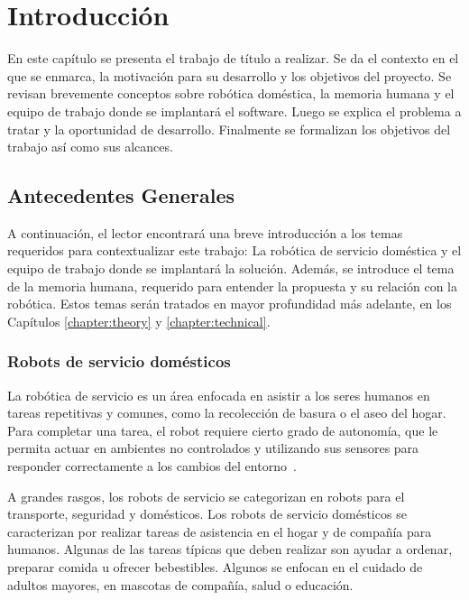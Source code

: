 \chapter{Introducción}\label{chapter:introduction}

En este capítulo se presenta el trabajo de título a realizar. Se da el contexto en el que se enmarca, la motivación para su desarrollo y los objetivos del proyecto. Se revisan brevemente conceptos sobre robótica doméstica, la memoria humana y el equipo de trabajo donde se implantará el software. Luego se explica el problema a tratar y la oportunidad de desarrollo. Finalmente se formalizan los objetivos del trabajo así como sus alcances.


\section{Antecedentes Generales}

A continuación, el lector encontrará una breve introducción a los temas requeridos para contextualizar este trabajo: La robótica de servicio doméstica y el equipo de trabajo donde se implantará la solución. Además, se introduce el tema de la memoria humana, requerido para entender la propuesta y su relación con la robótica. Estos temas serán tratados en mayor profundidad más adelante, en los Capítulos \ref{chapter:theory} y \ref{chapter:technical}.


\subsection{Robots de servicio domésticos}

La robótica de servicio es un área enfocada en asistir a los seres humanos en tareas repetitivas y comunes, como la recolección de basura o el aseo del hogar. Para completar una tarea, el robot requiere cierto grado de autonomía, que le permita actuar en ambientes no controlados y utilizando sus sensores para responder correctamente a los cambios del entorno~\cite{IFR}.

A grandes rasgos, los robots de servicio se categorizan en robots para el transporte, seguridad y domésticos. Los robots de servicio domésticos se caracterizan por realizar tareas de asistencia en el hogar y de compañía para humanos. Algunas de las tareas típicas que deben realizar son ayudar a ordenar, preparar comida u ofrecer bebestibles. Algunos se enfocan en el cuidado de adultos mayores, en mascotas de compañía, salud o educación.


